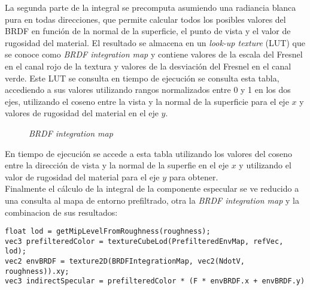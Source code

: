 
        La segunda parte de la integral se precomputa asumiendo una radiancia blanca pura en todas direcciones, que permite calcular
        todos los posibles valores del BRDF en funci\'on de la normal de la superficie, el punto de vista y el valor de rugosidad del material.
        El resultado se almacena en un \textit{look-up texture} (LUT) que se conoce como \textit{BRDF integration map} y contiene
        valores de la escala del Fresnel en el canal rojo de la textura y valores de la desviaci\'on del Fresnel en el canal verde.
        Este LUT se consulta en tiempo de ejecuci\'on se consulta esta tabla, accediendo a sus valores utilizando rangos normalizados entre
        0 y 1 en los dos ejes, utilizando el coseno entre la vista y la normal de la superficie para el eje $x$ y valores de rugosidad
        del material en el eje $y$.

        \begin{figure}[H]
            \vspace{0.5cm}
            \centering
            \caption{\textit{BRDF integration map}}
        \end{figure}
        \singlespacing

        
        En tiempo de ejecuci\'on se accede a esta tabla
        utilizando los valores del coseno entre la direcci\'on de vista y la normal de la superfie en el eje $x$ y utilizando
        el valor de rugosidad del material para el eje $y$ para obtener.\\

        Finalmente el c\'alculo de la integral de la componente especular se ve reducido a una consulta al mapa de entorno prefiltrado,
        otra la \textit{BRDF integration map} y la combinacion de sus resultados:

        \singlespacing
        \begin{lstlisting}[caption=C\'alculo de la componente especular debida al entorno]
float lod = getMipLevelFromRoughness(roughness);
vec3 prefilteredColor = textureCubeLod(PrefilteredEnvMap, refVec, lod);
vec2 envBRDF = texture2D(BRDFIntegrationMap, vec2(NdotV, roughness)).xy;
vec3 indirectSpecular = prefilteredColor * (F * envBRDF.x + envBRDF.y) 
        \end{lstlisting}
        \singlespacing
        




    


